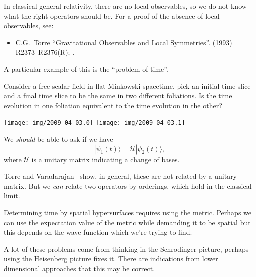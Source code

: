 \lecture

In classical general relativity, there are no local observables, so we
do not know what the right operators should be.  For a proof of the
absence of local observables, see:
\begin{itemize}
\item C.G.~Torre
``Gravitational Observables and Local Symmetries''.
  (1993) R2373--R2376(R); .\newline
{}
\end{itemize}
A particular example of this is the ``problem of time''.

Consider a free scalar field in flat Minkowski spacetime, pick an
initial time slice and a final time slice to be the same in two
different foliations.  Is the time evolution in one foliation equivalent
to the time evolution in the other?
\begin{center}
\texttt{[image: img/2009-04-03.0]}
\texttt{[image: img/2009-04-03.1]}
\end{center}
We \emph{should} be able to ask if we have
\begin{equation}
|\psi_{1}(t)\rangle = \mathcal{U}|\psi_{2}(t)\rangle,
\end{equation}
where $\mathcal{U}$ is a unitary matrix indicating a change of bases.

Torre and Varadarajan~\cite{Torre:1997zs,Torre:1998eq} show, in general,
these are not related by a unitary matrix.  But we \emph{can} relate two
operators by orderings, which hold in the classical limit.

Determining time by spatial hypersurfaces requires using the metric.
Perhaps we can use the expectation value of the metric while demanding
it to be spatial but this depends on the wave function which we're
trying to find.

A lot of these problems come from thinking in the Schrodinger picture,
perhaps using the Heisenberg picture fixes it.  There are indications
from lower dimensional approaches that this may be correct.